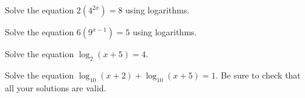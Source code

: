 \documentclass[11pt,letterpaper]{article}
\begin{document}

 Solve the equation $2(4^{2x})= 8$ using logarithms. \pspace





\newpage





 Solve the equation $6(9^{x-1})= 5$ using logarithms. \pspace





\newpage





 Solve the equation $\log_2(x + 5)= 4$. \pspace





\newpage





 Solve the equation $\log_{10}(x + 2) + \log_{10}(x + 5)= 1$. Be sure to check that all your solutions are valid. \pspace


\end{document}
